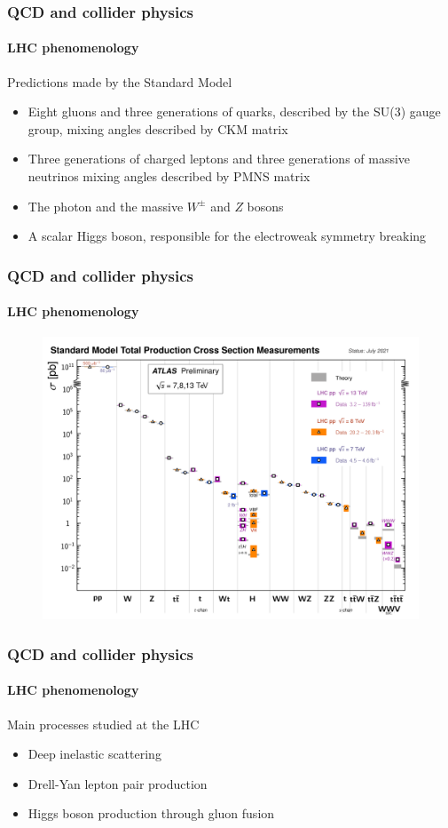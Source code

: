 \documentclass[aspectratio=43]{beamer}
\begin{document}
\begin{frame}
	
	\frametitle{QCD and collider physics}
	\framesubtitle{LHC phenomenology}
	
	\footnotesize Predictions made by the Standard Model
	
	\begin{itemize}
		\item \footnotesize Eight gluons and three generations of quarks, described by the SU(3) gauge group, mixing angles described by CKM matrix
		\item \footnotesize Three generations of charged leptons and three generations of massive neutrinos mixing angles described by PMNS matrix
		\item \footnotesize The photon and the massive $W^{\pm}$ and $Z$ bosons
		\item \footnotesize A scalar Higgs boson, responsible for the electroweak symmetry breaking 
	\end{itemize}

\end{frame}

\begin{frame}
	
	\frametitle{QCD and collider physics}
	\framesubtitle{LHC phenomenology}
	
	\begin{figure}
		\includegraphics[width = 8.5 cm]{plots/part1/chapter3/lhc_measurements.png}
	\end{figure}

\end{frame}

\begin{frame}
	
	\frametitle{QCD and collider physics}
	\framesubtitle{LHC phenomenology}
	
	\footnotesize Main processes studied at the LHC
	
	\begin{itemize}
		\item \footnotesize Deep inelastic scattering
		\item \footnotesize Drell-Yan lepton pair production
		\item \footnotesize Higgs boson production through gluon fusion
	\end{itemize}

\end{frame}
\end{document}
